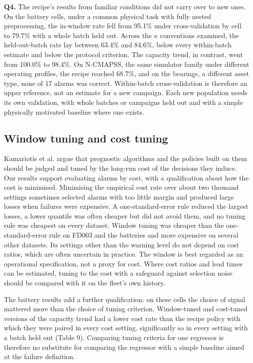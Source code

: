 \documentclass[a4paper,fleqn,doubleblind]{cas-dc}
\begin{document}
\textbf{Q4.} The recipe's results from familiar conditions did not carry over to new ones. On the battery cells, under a common physical task with fully nested preprocessing, the in-window rate fell from 95.1\% under cross-validation by cell to 79.7\% with a whole batch held out. Across the $\kappa$ conventions examined, the held-out-batch rate lay between 63.4\% and 84.6\%, below every within-batch estimate and below the protocol criterion. The capacity trend, in contrast, went from 100.0\% to 98.4\%. On N-CMAPSS, the same simulator family under different operating profiles, the recipe reached 68.7\%, and on the bearings, a different asset type, none of 17 alarms was correct. Within-batch cross-validation is therefore an upper reference, not an estimate for a new campaign. Each new population needs its own validation, with whole batches or campaigns held out and with a simple physically motivated baseline where one exists.

\subsection{Window tuning and cost tuning}

Kamariotis et al. \cite{kamariotis2024} argue that prognostic algorithms and the policies built on them should be judged and tuned by the long-run cost of the decisions they induce. Our results support evaluating alarms by cost, with a qualification about how the cost is minimised. Minimising the empirical cost rate over about two thousand settings sometimes selected alarms with too little margin and produced large losses when failures were expensive. A one-standard-error rule reduced the largest losses, a lower quantile was often cheaper but did not avoid them, and no tuning rule was cheapest on every dataset. Window tuning was cheaper than the one-standard-error rule on FD003 and the batteries and more expensive on several other datasets. Its settings other than the warning level do not depend on cost ratios, which are often uncertain in practice. The window is best regarded as an operational specification, not a proxy for cost. Where cost ratios and lead times can be estimated, tuning to the cost with a safeguard against selection noise should be compared with it on the fleet's own history.

The battery results add a further qualification: on these cells the choice of signal mattered more than the choice of tuning criterion. Window-tuned and cost-tuned versions of the capacity trend had a lower cost rate than the recipe policy with which they were paired in every cost setting, significantly so in every setting with a batch held out (Table 9). Comparing tuning criteria for one regressor is therefore no substitute for comparing the regressor with a simple baseline aimed at the failure definition.
\end{document}
